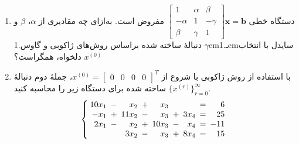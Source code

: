 \begin{enumerate}
	\item 
	دستگاه خطی 
	\(  \begin{bmatrix}
		1 & \alpha & \beta \\ -\alpha & 1 & -\gamma \\ \beta & \gamma & 1
	\end{bmatrix} \textbf{x}  = \textbf{b}\)
مفروض است. به‌ازای چه مقادیری از 
\(\alpha\)، \(\beta\) و \(\gamma\)
دنبالهٔ ساخته شده براساس روش‌های ژاکوبی و گاوس{\kern.1em}ـ‌{\kern.1em}سایدل با انتخاب 
\(x^{(0)}\)
دلخواه، همگراست؟
	\item
	با استفاده از روش ژاکوبی با شروع از 
	\(x^{(0)} =\begin{bmatrix}
		0& 0&0&0
	\end{bmatrix}^T\)،
جملهٔ دوم دنبالهٔ
\(\{x^{(r)}\}_{r=0}^\infty\)
ساخته شده برای دستگاه زیر را محاسبه کنید.
\[  \arraycolsep=.5\arraycolsep
	\left\{\begin{array}{rcrcrcrcr}
		10x_1 & - & x_2  & + & x_3 && & = & 6\\
		-x_1 & + & 11x_2  & - & x_3 &+& 3x_4& = & 25\\
	 2x_1 & - & x_2  & + & 10x_3 &-& x_4& = & -11\\
	  &  & 3x_2  & - & x_3 &+& 8x_4& = & 15
	\end{array}\right.
\]

\end{enumerate}
